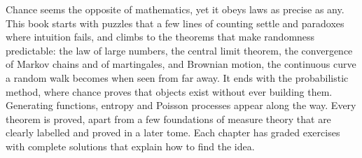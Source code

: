 Chance seems the opposite of mathematics, yet it obeys laws as precise as any. This book starts with puzzles that a few
lines of counting settle and paradoxes where intuition fails, and climbs to the theorems that make randomness
predictable: the law of large numbers, the central limit theorem, the convergence of Markov chains and of martingales,
and Brownian motion, the continuous curve a random walk becomes when seen from far away. It ends with the probabilistic
method, where chance proves that objects exist without ever building them. Generating functions, entropy and Poisson
processes appear along the way. Every theorem is proved, apart from a few foundations of measure theory that are
clearly labelled and proved in a later tome. Each chapter has graded exercises with complete
solutions that explain how to find the idea.
